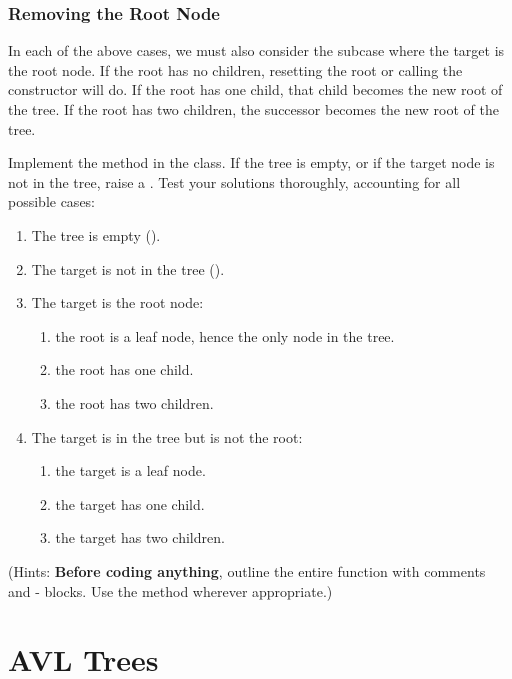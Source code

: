 \subsubsection*{Removing the Root Node} %

In each of the above cases, we must also consider the subcase where the target is the root node.
If the root has no children, resetting the root or calling the constructor will do.
If the root has one child, that child becomes the new root of the tree.
If the root has two children, the successor becomes the new root of the tree.

\begin{problem} %
Implement the  method in the  class.
If the tree is empty, or if the target node is not in the tree, raise a .
Test your solutions thoroughly, accounting for all possible cases:
\begin{enumerate}
\item The tree is empty ().
\item The target is not in the tree ().
\item The target is the root node:
	\begin{enumerate}
	\item the root is a leaf node, hence the only node in the tree.
	\item the root has one child.
	\item the root has two children.
	\end{enumerate}
\item The target is in the tree but is not the root:
	\begin{enumerate}
	\item the target is a leaf node.
	\item the target has one child.
	\item the target has two children.
	\end{enumerate}
\end{enumerate}
(Hints: \textbf{Before coding anything}, outline the entire function with comments and - blocks.
Use the  method wherever appropriate.)
\end{problem}

\section*{AVL Trees} %

